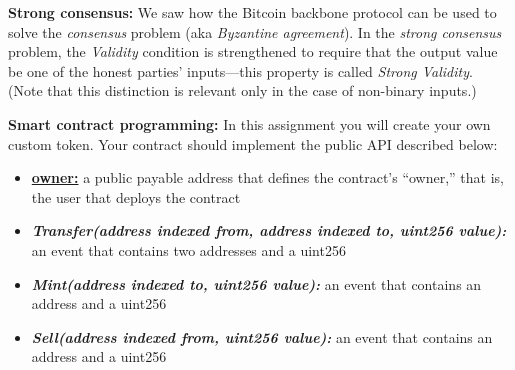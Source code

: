 \documentclass[12pt,addpoints,answers]{exam}
\begin{document}
\begin{questions}
\begin{parts}
    \end{parts}

\newpage

\question \textbf{Strong consensus:} We saw how the Bitcoin backbone protocol can be used to solve the {\em consensus} problem (aka {\em Byzantine agreement}). In the {\em strong consensus} problem, the {\em Validity} condition is strengthened to require that the output value be one of the honest parties' inputs---this property is called {\em Strong Validity}. (Note that this distinction is relevant only in the case of non-binary inputs.)


\newpage

\question \textbf{Smart contract programming:}  In this assignment you will create your own custom token. Your contract should implement the public API described below:

\begin{itemize}
\item \underline{\textbf{owner:}} a public payable address that defines the contract’s ``owner,'' that is, the user that deploys the contract
\item \textbf{\textit{Transfer(address indexed from, address indexed to, uint256 value):}} an event that contains two addresses and a uint256
\item \textbf{\textit{Mint(address indexed to, uint256 value):}} an event that contains an address and a uint256
\item \textbf{\textit{Sell(address indexed from, uint256 value):}} an event that contains an address and a uint256


\end{itemize}
\end{questions}
\end{document}
